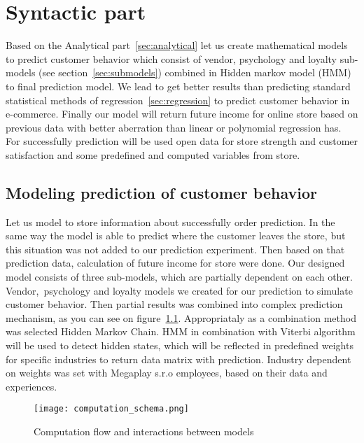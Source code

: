 




\chapter{Syntactic part} \label{sec:methodology}
Based on the Analytical part~\ref{sec:analytical} let us create  mathematical models to predict customer behavior which consist of
vendor, psychology and loyalty sub-models (see section~\ref {sec:submodels}) combined in Hidden markov model (HMM) to final prediction model.
We lead to get better results than predicting standard statistical methods of regression~\ref{sec:regression} to predict customer behavior in e-commerce.
Finally our model will return future income for online store based on previous data with better aberration than linear or polynomial regression has.
For successfully prediction will be used open data for store strength and customer satisfaction and some predefined and computed variables from store.
\section {Modeling prediction of customer behavior} \label{sec:modeling}
Let us model to store information about successfully order prediction.
In the same way the model is able to predict where the customer leaves the store, but this situation was not added to our prediction experiment.
Then based on that prediction data, calculation of future income for store were done.
Our designed model consists of three sub-models, which are partially dependent on each other.
Vendor,\ psychology and loyalty models we created for our prediction to simulate customer behavior.
Then partial results was combined into complex prediction mechanism, as you can see on figure~\ref{Model schema with interaction}.
Appropriataly as a combination method was selected Hidden Markov Chain.
HMM in combination with Viterbi algorithm will be used to detect hidden states, which will be reflected in predefined weights for specific
industries to return data matrix with prediction.
Industry dependent on weights was set with Megaplay s.r.o employees, based on their data and experiences.
\\
\begin{figure}[h!]
    \begin{center}
        \texttt{[image: computation\_schema.png]}
    \end{center}
    \caption{Computation flow and interactions between models}
    \label{Model schema with interaction}
\end{figure}
\\

